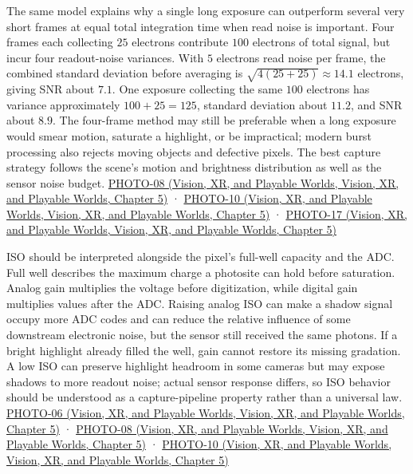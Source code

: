 The same model explains why a single long exposure can outperform several very short frames at equal total integration time when read noise is important. Four frames each collecting \(25\) electrons contribute \(100\) electrons of total signal, but incur four readout-noise variances. With \(5\) electrons read noise per frame, the combined standard deviation before averaging is \(\sqrt{4(25+25)}\approx14.1\) electrons, giving SNR about \(7.1\). One exposure collecting the same \(100\) electrons has variance approximately \(100+25=125\), standard deviation about \(11.2\), and SNR about \(8.9\). The four-frame method may still be preferable when a long exposure would smear motion, saturate a highlight, or be impractical; modern burst processing also rejects moving objects and defective pixels. The best capture strategy follows the scene's motion and brightness distribution as well as the sensor noise budget. \href{../07-Vision-XR-and-Playable-Worlds/main.pdf\#nameddest=04-visual-computing-ii-ch036-photo-08---photography-session-08}{PHOTO-08 (Vision, XR, and Playable Worlds, Vision, XR, and Playable Worlds, Chapter 5)} · \href{../07-Vision-XR-and-Playable-Worlds/main.pdf\#nameddest=04-visual-computing-ii-ch036-photo-10---photography-session-10}{PHOTO-10 (Vision, XR, and Playable Worlds, Vision, XR, and Playable Worlds, Chapter 5)} · \href{../07-Vision-XR-and-Playable-Worlds/main.pdf\#nameddest=04-visual-computing-ii-ch036-photo-17---photography-session-17}{PHOTO-17 (Vision, XR, and Playable Worlds, Vision, XR, and Playable Worlds, Chapter 5)}

ISO should be interpreted alongside the pixel's full-well capacity and the ADC. Full well describes the maximum charge a photosite can hold before saturation. Analog gain multiplies the voltage before digitization, while digital gain multiplies values after the ADC. Raising analog ISO can make a shadow signal occupy more ADC codes and can reduce the relative influence of some downstream electronic noise, but the sensor still received the same photons. If a bright highlight already filled the well, gain cannot restore its missing gradation. A low ISO can preserve highlight headroom in some cameras but may expose shadows to more readout noise; actual sensor response differs, so ISO behavior should be understood as a capture-pipeline property rather than a universal law. \href{../07-Vision-XR-and-Playable-Worlds/main.pdf\#nameddest=04-visual-computing-ii-ch036-photo-06---photography-session-06}{PHOTO-06 (Vision, XR, and Playable Worlds, Vision, XR, and Playable Worlds, Chapter 5)} · \href{../07-Vision-XR-and-Playable-Worlds/main.pdf\#nameddest=04-visual-computing-ii-ch036-photo-08---photography-session-08}{PHOTO-08 (Vision, XR, and Playable Worlds, Vision, XR, and Playable Worlds, Chapter 5)} · \href{../07-Vision-XR-and-Playable-Worlds/main.pdf\#nameddest=04-visual-computing-ii-ch036-photo-10---photography-session-10}{PHOTO-10 (Vision, XR, and Playable Worlds, Vision, XR, and Playable Worlds, Chapter 5)}

